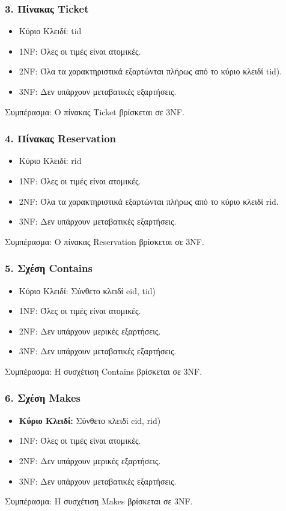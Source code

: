 \documentclass{article}
\begin{document}
\subsubsection*{3. Πίνακας Ticket}
\begin{itemize}
    \item Κύριο Κλειδί: tid
    \item 1NF: Όλες οι τιμές είναι ατομικές.
    \item 2NF: Όλα τα χαρακτηριστικά εξαρτώνται πλήρως από το κύριο κλειδί tid).
    \item 3NF: Δεν υπάρχουν μεταβατικές εξαρτήσεις.
\end{itemize}
Συμπέρασμα: Ο πίνακας Ticket βρίσκεται σε 3NF.

\subsubsection*{4. Πίνακας Reservation}
\begin{itemize}
    \item Κύριο Κλειδί: rid
    \item 1NF: Όλες οι τιμές είναι ατομικές.
    \item 2NF: Όλα τα χαρακτηριστικά εξαρτώνται πλήρως από το κύριο κλειδί rid.
    \item 3NF: Δεν υπάρχουν μεταβατικές εξαρτήσεις.
\end{itemize}
Συμπέρασμα: Ο πίνακας Reservation βρίσκεται σε 3NF.

\subsubsection*{5. Σχέση Contains}
\begin{itemize}
    \item Κύριο Κλειδί: Σύνθετο κλειδί eid, tid)
    \item 1NF: Όλες οι τιμές είναι ατομικές.
    \item 2NF: Δεν υπάρχουν μερικές εξαρτήσεις.
    \item 3NF: Δεν υπάρχουν μεταβατικές εξαρτήσεις.
\end{itemize}
Συμπέρασμα: Η συσχέτιση Contains βρίσκεται σε 3NF.

\subsubsection*{6. Σχέση Makes}
\begin{itemize}
    \item \textbf{Κύριο Κλειδί:} Σύνθετο κλειδί cid, rid)
    \item 1NF: Όλες οι τιμές είναι ατομικές.
    \item 2NF: Δεν υπάρχουν μερικές εξαρτήσεις.
    \item 3NF: Δεν υπάρχουν μεταβατικές εξαρτήσεις.
\end{itemize}
Συμπέρασμα: Η συσχέτιση Makes βρίσκεται σε 3NF.
\end{document}
